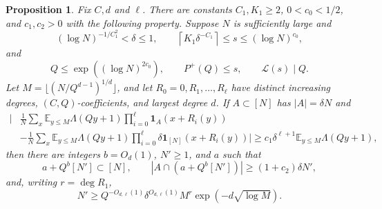 \documentclass[12pt]{amsart}
\newcommand{\E}{\mathbb E}
\newcommand{\1}{\mathbf 1}
\newtheorem{proposition}[theorem]{Proposition}
\begin{document}
\begin{proposition}
\label{p:KMTT}
Fix $C,d$ and $\ell$. There are constants
$C_1,K_1\geq2$, $0<c_0<1/2$, and $c_1,c_2>0$ with the following
property. Suppose
$N$ is sufficiently large and
\[
 (\log N)^{-1/C_1^2}<\delta\leq1,\qquad
 \left\lceil K_1\delta^{-C_1}\right\rceil\leq s
 \leq(\log N)^{c_0},
\]
and
\[
 Q\leq\exp((\log N)^{2c_0}),\qquad
 P^+(Q)\leq s,\qquad \mathcal L(s)\mid Q.
\]
Let $M=\lfloor(N/Q^{d-1})^{1/d}\rfloor$, and let
$R_0=0,R_1,\ldots,R_\ell$ have distinct increasing degrees,
$(C,Q)$-coefficients, and largest degree $d$. If $A\subset[N]$ has
$|A|=\delta N$ and
\begin{align}\label{e:prime-discrepancy}
 \bigg|&\frac1N\sum_x\E_{y\leq M}\Lambda(Qy+1)
 \prod_{i=0}^{\ell}\1_A(x+R_i(y))\\
 &-\frac1N\sum_x\E_{y\leq M}\Lambda(Qy+1)
 \prod_{i=0}^{\ell}\delta\1_{[N]}(x+R_i(y))\bigg|
 \geq c_1\delta^{\ell+1}\E_{y\leq M}\Lambda(Qy+1),
 \nonumber
\end{align}
then there are integers $b=O_d(1)$, $N'\geq1$, and $a$ such that
\begin{equation}\label{e:density-increment}
 a+Q^b[N']\subset[N],\qquad
 |A\cap(a+Q^b[N'])|\geq(1+c_2)\delta N',
\end{equation}
and, writing $r=\deg R_1$,
\begin{equation}\label{e:increment-length}
 N'\geq Q^{-O_{d,\ell}(1)}\delta^{O_{d,\ell}(1)}
 M^r\exp(-d\sqrt{\log M}).
\end{equation}
\end{proposition}
\end{document}
